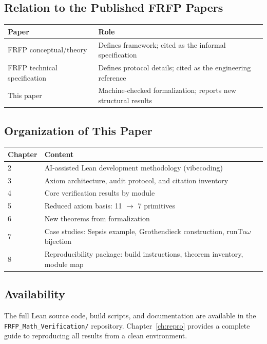 \subsection{Relation to the Published FRFP Papers}

\begin{center}
\begin{tabular}{ll}
\toprule
Paper & Role \\
\midrule
FRFP conceptual/theory & Defines framework; cited as the informal specification \\
FRFP technical specification & Defines protocol details; cited as the engineering reference \\
This paper & Machine-checked formalization; reports new structural results \\
\bottomrule
\end{tabular}
\end{center}

\subsection{Organization of This Paper}

\begin{center}
\begin{tabular}{ll}
\toprule
Chapter & Content \\
\midrule
2 & AI-assisted Lean development methodology (vibecoding) \\
3 & Axiom architecture, audit protocol, and citation inventory \\
4 & Core verification results by module \\
5 & Reduced axiom basis: 11 $\to$ 7 primitives \\
6 & New theorems from formalization \\
7 & Case studies: Sepsis example, Grothendieck construction, $\mathrm{runTo}\omega$ bijection \\
8 & Reproducibility package: build instructions, theorem inventory, module map \\
\bottomrule
\end{tabular}
\end{center}

\subsection{Availability}

The full Lean source code, build scripts, and documentation are available in the
\texttt{FRFP\_Math\_Verification/} repository. Chapter~\ref{ch:repro} provides a
complete guide to reproducing all results from a clean environment.
